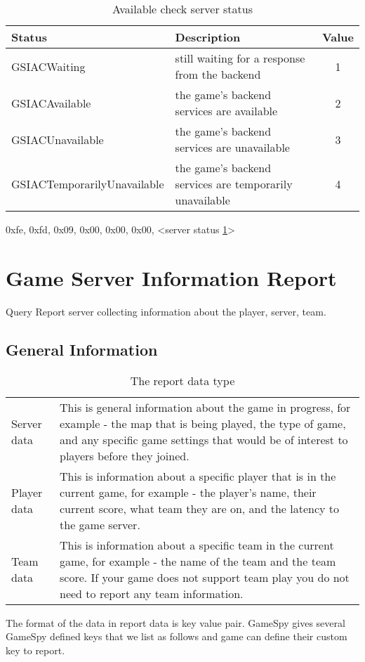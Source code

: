 \documentclass[oneside,titlepage,a4paper]{Definition/retrospy} %
\begin{document}
\begin{table}[H]
	\centering
	\begin{tabular}{|l|m{5cm}|c|}
		\hline
		\textbf{Status}&\textbf{Description}&\textbf{Value}\\\hline
		GSIACWaiting&still waiting for a response from the backend&1\\\hline
		GSIACAvailable&the game's backend services are available&2\\\hline
		GSIACUnavailable& the game's backend services are unavailable&3\\\hline
		GSIACTemporarilyUnavailable&the game's backend services are temporarily unavailable&4\\\hline
	\end{tabular}
\caption{Available check server status}
\label{Available check server status}
\end{table}

\ServerResponse

\begin{mybox}
	0xfe, 0xfd, 0x09, 0x00, 0x00, 0x00, <server status \ref{Available check server status}>
\end{mybox}

\chapter{Game Server Information Report}
Query Report server collecting information about the player, server, team.
\section{General Information}
\begin{table}[H]
	\centering
	\begin{tabular}{|l|m{9cm}|}
		\hline
		\tbf{Data type}&\tbf{Description}\\\hline
		Server data&This is general information about the game in progress, for example - the map that is being played, the type of game, and any specific game settings that would be of interest to players before they joined.\\\hline
		Player data&This is information about a specific player that is in the current game, for example - the player's name, their current score, what team they are on, and the latency to the game server. 
		\\\hline
		Team data&This is information about a specific team in the current game, for example - the name of the team and the team score. If your game does not support team play you do not need to report any team information. 
		\\\hline
	\end{tabular}
\caption{The report data type }
\label{The report data type}
\end{table}
The format of the data in report data is key value pair. GameSpy gives several GameSpy defined keys that we list as follows and game can define their custom key to report.
\end{document}
